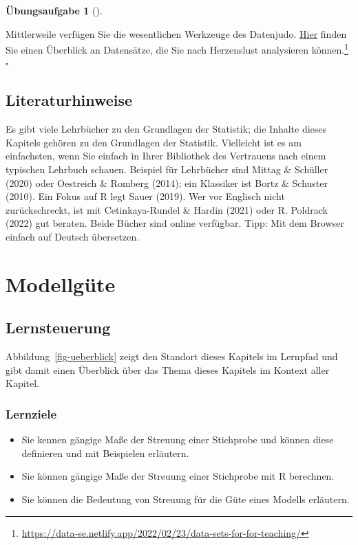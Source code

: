 \documentclass[
  letterpaper,
]{scrbook}
\providecommand{\tightlist}{%
  \setlength{\itemsep}{0pt}\setlength{\parskip}{0pt}}\usepackage{longtable,booktabs,array}
\theoremstyle{definition}
\theoremstyle{definition}
\theoremstyle{definition}
\newtheorem{exercise}{Übungsaufgabe}[chapter]
\theoremstyle{remark}
\begin{document}
\begin{exercise}[]\protect\hypertarget{exr-datensaetze}{}\label{exr-datensaetze}

Mittlerweile verfügen Sie die wesentlichen Werkzeuge des Datenjudo.
\href{https://data-se.netlify.app/2022/02/23/data-sets-for-for-teaching/}{Hier}
finden Sie einen Überblick an Datensätze, die Sie nach Herzenslust
analysieren können.\footnote{\url{https://data-se.netlify.app/2022/02/23/data-sets-for-for-teaching/}}
\(\square\)

\end{exercise}

\section{Literaturhinweise}\label{literaturhinweise-4}

Es gibt viele Lehrbücher zu den Grundlagen der Statistik; die Inhalte
dieses Kapitels gehören zu den Grundlagen der Statistik. Vielleicht ist
es am einfachsten, wenn Sie einfach in Ihrer Bibliothek des Vertrauens
nach einem typischen Lehrbuch schauen. Beispiel für Lehrbücher sind
Mittag \& Schüller (2020) oder Oestreich \& Romberg (2014); ein
Klassiker ist Bortz \& Schuster (2010). Ein Fokus auf R legt Sauer
(2019). Wer vor Englisch nicht zurückschreckt, ist mit Cetinkaya-Rundel
\& Hardin (2021) oder R. Poldrack (2022) gut beraten. Beide Bücher sind
online verfügbar. Tipp: Mit dem Browser einfach auf Deutsch übersetzen.

\chapter{Modellgüte}\label{modellguxfcte}

\section{Lernsteuerung}\label{lernsteuerung-5}

Abbildung~\ref{fig-ueberblick} zeigt den Standort dieses Kapitels im
Lernpfad und gibt damit einen Überblick über das Thema dieses Kapitels
im Kontext aller Kapitel.

\subsection{Lernziele}\label{lernziele-6}

\begin{itemize}
\tightlist
\item
  Sie kennen gängige Maße der Streuung einer Stichprobe und können diese
  definieren und mit Beispielen erläutern.
\item
  Sie können gängige Maße der Streuung einer Stichprobe mit R berechnen.
\item
  Sie können die Bedeutung von Streuung für die Güte eines Modells
  erläutern.
\end{itemize}
\end{document}

